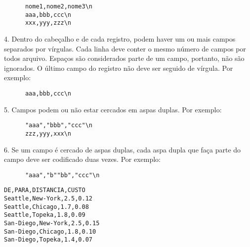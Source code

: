 \documentclass[11pt, brazil]{report}
\def\para#1{\noindent{\bf#1}}
\begin{document}
\begin{verbatim}
      nome1,nome2,nome3\n
      aaa,bbb,ccc\n
      xxx,yyy,zzz\n
\end{verbatim}

4. Dentro do cabeçalho e de cada registro, podem haver um ou mais campos
separados por vírgulas. Cada linha deve conter o mesmo número de campos
por todos arquivo. Espaços são considerados parte de um campo, portanto,
não são ignorados. O último campo do registro não deve ser seguido de
vírgula. Por exemplo:

\begin{verbatim}
      aaa,bbb,ccc\n
\end{verbatim}

5. Campos podem ou não estar cercados em aspas duplas. Por exemplo:

\begin{verbatim}
      "aaa","bbb","ccc"\n
      zzz,yyy,xxx\n
\end{verbatim}

6. Se um campo é cercado de aspas duplas, cada aspa dupla que faça
parte do campo deve ser codificado duas vezes. Por exemplo:

\begin{verbatim}
      "aaa","b""bb","ccc"\n
\end{verbatim}

\para{Exemplo}

\begin{verbatim}
DE,PARA,DISTANCIA,CUSTO
Seattle,New-York,2.5,0.12
Seattle,Chicago,1.7,0.08
Seattle,Topeka,1.8,0.09
San-Diego,New-York,2.5,0.15
San-Diego,Chicago,1.8,0.10
San-Diego,Topeka,1.4,0.07
\end{verbatim}
\end{document}
